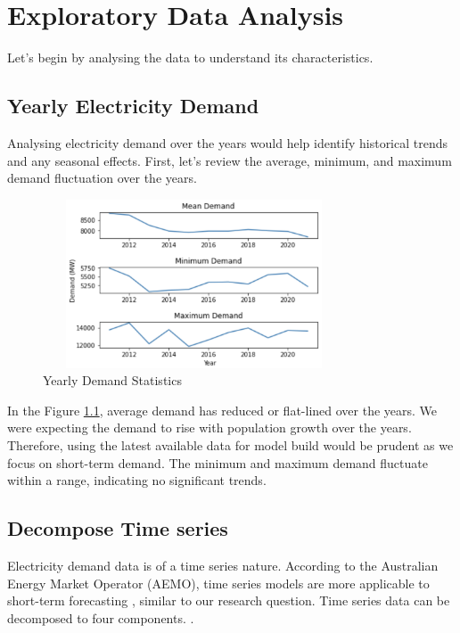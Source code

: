 \documentclass[mstat,12pt]{unswthesis}
\begin{document}
\chapter{Exploratory Data Analysis}\label{exploratory-data-analysis}

Let's begin by analysing the data to understand its characteristics.

\section{Yearly Electricity Demand}\label{yearly-electricity-demand}

Analysing electricity demand over the years would help identify
historical trends and any seasonal effects. First, let's review the
average, minimum, and maximum demand fluctuation over the years.

\begin{figure}[H]
\centering
\includegraphics[width=0.80\textwidth,height=5cm]{demand_stats.png}
\caption{Yearly Demand Statistics}
\label{demand_stats}
\end{figure}

In the Figure \ref{demand_stats}, average demand has reduced or
flat-lined over the years. We were expecting the demand to rise with
population growth over the years. Therefore, using the latest available
data for model build would be prudent as we focus on short-term demand.
The minimum and maximum demand fluctuate within a range, indicating no
significant trends.

\section{Decompose Time series}\label{decompose-time-series}

Electricity demand data is of a time series nature. According to the
Australian Energy Market Operator (AEMO), time series models are more
applicable to short-term forecasting \cite{aemo2023forecasting}, similar
to our research question. Time series data can be decomposed to four
components. \cite{brownlee_2017_how}.
\end{document}

